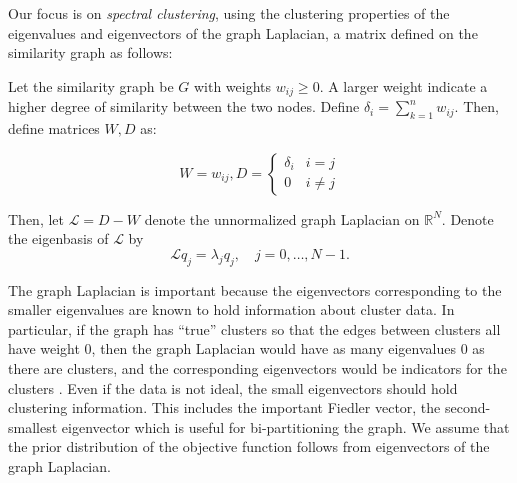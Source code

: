 \documentclass{siamart1116}
\begin{document}
Our focus is on \textit{spectral clustering}, using the clustering properties of the eigenvalues and eigenvectors of the graph Laplacian, a matrix defined on the similarity graph as follows:

Let the similarity graph be $G$ with weights $w_{ij} \ge 0$. A larger weight indicate a higher degree of similarity between the two nodes. Define $\delta_i = \sum_{k=1}^n w_{ij}$. Then, define matrices $W, D$ as:

\[W = w_{ij}, D = \begin{cases} 
\delta_i    & i = j \\
0           & i \neq j 
\end{cases}\]

Then, let $\mathcal{L} = D - W$ denote the unnormalized graph Laplacian on $\mathbb{R}^N$. Denote the eigenbasis of $\mathcal{L}$ by
\begin{equation}
\label{eqn:laplacian}
\mathcal{L}q_j = \lambda_j q_j,\quad j=0,\ldots,N-1.
\end{equation}

The graph Laplacian is important because the eigenvectors corresponding to the smaller eigenvalues are known to hold information about cluster data. In particular, if the graph has ``true'' clusters so that the edges between clusters all have weight 0, then the graph Laplacian would have as many eigenvalues 0 as there are clusters, and the corresponding eigenvectors would be indicators for the clusters \cite{Spectral}. Even if the data is not ideal, the small eigenvectors should hold clustering information. This includes the important Fiedler vector, the second-smallest eigenvector which is useful for bi-partitioning the graph. We assume that the prior distribution of the objective function follows from eigenvectors of the graph Laplacian.
\end{document}
